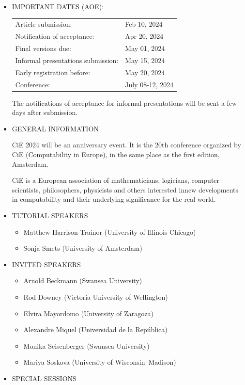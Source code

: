 \documentclass[prodmode,acmtecs]{acmsmall} %
\begin{document}
\begin{itemize}\item  IMPORTANT DATES (AOE): 
 
\begin{tabulary}{\linewidth}{LL}Article submission:  & Feb 10, 2024 \\
Notification of acceptance:  & Apr 20, 2024 \\
Final versions due:  & May 01, 2024 \\
Informal presentations submission:  & May 15, 2024 \\
Early registration before:  & May 20, 2024 \\
Conference:  & July 08-12, 2024 \\
\end{tabulary}
 
  The notifications of acceptance for informal presentations will be sent a few days after submission. 
 
\item  GENERAL INFORMATION 
 
  CiE 2024 will be an anniversary event. It is the 20th conference organized by CiE (Computability in Europe), in the same place as the first edition, Amsterdam. 
 
  CiE is a European association of mathematicians, logicians, computer scientists, philosophers, physicists and others interested innew developments in computability and their underlying significance for the real world. 
 
\item  TUTORIAL SPEAKERS 
 
\begin{itemize}\item  Matthew Harrison-Trainor (University of Illinois Chicago)
\item  Sonja Smets (University of Amsterdam)
\end{itemize} 
\item  INVITED SPEAKERS 
 
\begin{itemize}\item  Arnold Beckmann (Swansea University)
\item  Rod Downey (Victoria University of Wellington)
\item  Elvira Mayordomo (University of Zaragoza)
\item  Alexandre Miquel (Universidad de la República)
\item  Monika Seisenberger (Swansea University)
\item  Mariya Soskova (University of Wisconsin–Madison)
\end{itemize} 
\item  SPECIAL SESSIONS 
 

\end{itemize}
\end{document}
